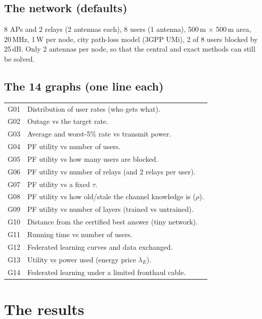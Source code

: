 \documentclass[11pt,a4paper]{article}
\begin{document}
\subsection*{The network (defaults)}
8 APs and 2 relays (2 antennas each), 8 users (1 antenna), 500\,m $\times$ 500\,m area, 20\,MHz, 1\,W per node,
city path-loss model (3GPP UMi), 2 of 8 users blocked by 25\,dB. Only 2 antennas per node, so that the central
and exact methods can still be solved.

\subsection*{The 14 graphs (one line each)}
\begin{tabular}{@{}ll@{}}
G01 & Distribution of user rates (who gets what). \\
G02 & Outage vs the target rate. \\
G03 & Average and worst-5\% rate vs transmit power. \\
G04 & PF utility vs number of users. \\
G05 & PF utility vs how many users are blocked. \\
G06 & PF utility vs number of relays (and 2 relays per user). \\
G07 & PF utility vs a fixed $\tau$. \\
G08 & PF utility vs how old/stale the channel knowledge is ($\rho$). \\
G09 & PF utility vs number of layers (trained vs untrained). \\
G10 & Distance from the certified best answer (tiny network). \\
G11 & Running time vs number of users. \\
G12 & Federated learning curves and data exchanged. \\
G13 & Utility vs power used (energy price $\lambda_E$). \\
G14 & Federated learning under a limited fronthaul cable. \\
\end{tabular}

\section{The results}
\end{document}
